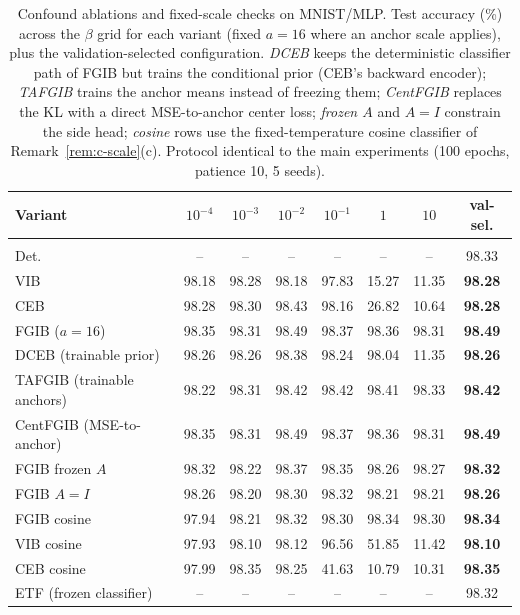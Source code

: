 \begin{table}[t]
\caption{Confound ablations and fixed-scale checks on MNIST/MLP. Test accuracy (\%) across the $\beta$ grid for each variant (fixed $a=16$ where an anchor scale applies), plus the validation-selected configuration. \emph{DCEB} keeps the deterministic classifier path of FGIB but trains the conditional prior (CEB's backward encoder); \emph{TAFGIB} trains the anchor means instead of freezing them; \emph{CentFGIB} replaces the KL with a direct MSE-to-anchor center loss; \emph{frozen $A$} and \emph{$A{=}I$} constrain the side head; \emph{cosine} rows use the fixed-temperature cosine classifier of Remark~\ref{rem:c-scale}(c). Protocol identical to the main experiments (100 epochs, patience 10, 5 seeds).}
\label{tab:ablation}
\begin{center}\small
\begin{tabular}{lccccccc}
Variant & $10^{-4}$ & $10^{-3}$ & $10^{-2}$ & $10^{-1}$ & $1$ & $10$ & val-sel. \\ \hline \\[-1.8ex]
Det. & -- & -- & -- & -- & -- & -- & 98.33 \\
VIB & 98.18 & 98.28 & 98.18 & 97.83 & 15.27 & 11.35 & \textbf{98.28} \\
CEB & 98.28 & 98.30 & 98.43 & 98.16 & 26.82 & 10.64 & \textbf{98.28} \\
FGIB ($a{=}16$) & 98.35 & 98.31 & 98.49 & 98.37 & 98.36 & 98.31 & \textbf{98.49} \\
DCEB (trainable prior) & 98.26 & 98.26 & 98.38 & 98.24 & 98.04 & 11.35 & \textbf{98.26} \\
TAFGIB (trainable anchors) & 98.22 & 98.31 & 98.42 & 98.42 & 98.41 & 98.33 & \textbf{98.42} \\
CentFGIB (MSE-to-anchor) & 98.35 & 98.31 & 98.49 & 98.37 & 98.36 & 98.31 & \textbf{98.49} \\
FGIB frozen $A$ & 98.32 & 98.22 & 98.37 & 98.35 & 98.26 & 98.27 & \textbf{98.32} \\
FGIB $A{=}I$ & 98.26 & 98.20 & 98.30 & 98.32 & 98.21 & 98.21 & \textbf{98.26} \\
FGIB cosine & 97.94 & 98.21 & 98.32 & 98.30 & 98.34 & 98.30 & \textbf{98.34} \\
VIB cosine & 97.93 & 98.10 & 98.12 & 96.56 & 51.85 & 11.42 & \textbf{98.10} \\
CEB cosine & 97.99 & 98.35 & 98.25 & 41.63 & 10.79 & 10.31 & \textbf{98.35} \\
ETF (frozen classifier) & -- & -- & -- & -- & -- & -- & 98.32 \\
\end{tabular}\end{center}\end{table}
